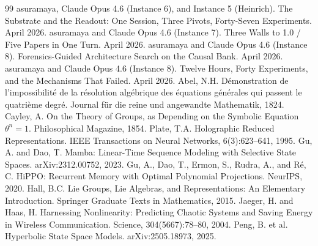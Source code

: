 \documentclass[11pt,a4paper]{report}
\begin{document}
\begin{thebibliography}{99}
 asuramaya, Claude Opus 4.6 (Instance 6), and Instance 5 (Heinrich). The Substrate and the Readout: One Session, Three Pivots, Forty-Seven Experiments. April 2026.
 asuramaya and Claude Opus 4.6 (Instance 7). Three Walls to 1.0 / Five Papers in One Turn. April 2026.
 asuramaya and Claude Opus 4.6 (Instance 8). Forensics-Guided Architecture Search on the Causal Bank. April 2026.
 asuramaya and Claude Opus 4.6 (Instance 8). Twelve Hours, Forty Experiments, and the Mechanisms That Failed. April 2026.
 Abel, N.H. D\'{e}monstration de l'impossibilit\'{e} de la r\'{e}solution alg\'{e}brique des \'{e}quations g\'{e}n\'{e}rales qui passent le quatri\`{e}me degr\'{e}. Journal f\"{u}r die reine und angewandte Mathematik, 1824.
 Cayley, A. On the Theory of Groups, as Depending on the Symbolic Equation $\theta^n = 1$. Philosophical Magazine, 1854.
 Plate, T.A. Holographic Reduced Representations. IEEE Transactions on Neural Networks, 6(3):623--641, 1995.
 Gu, A. and Dao, T. Mamba: Linear-Time Sequence Modeling with Selective State Spaces. arXiv:2312.00752, 2023.
 Gu, A., Dao, T., Ermon, S., Rudra, A., and R\'{e}, C. HiPPO: Recurrent Memory with Optimal Polynomial Projections. NeurIPS, 2020.
 Hall, B.C. Lie Groups, Lie Algebras, and Representations: An Elementary Introduction. Springer Graduate Texts in Mathematics, 2015.
 Jaeger, H. and Haas, H. Harnessing Nonlinearity: Predicting Chaotic Systems and Saving Energy in Wireless Communication. Science, 304(5667):78--80, 2004.
 Peng, B. et al. Hyperbolic State Space Models. arXiv:2505.18973, 2025.
\end{thebibliography}
\end{document}
